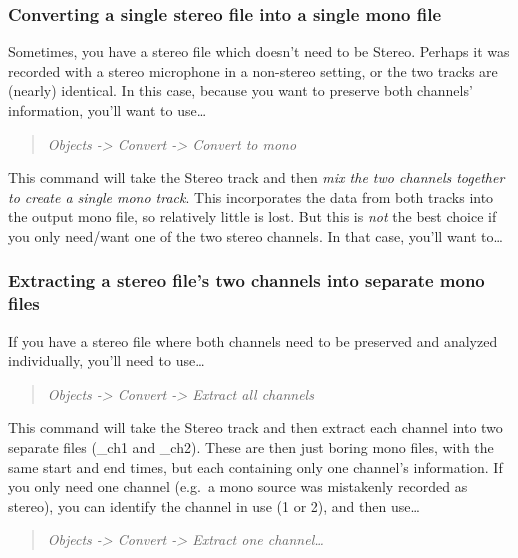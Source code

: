 \hypertarget{converting-a-single-stereo-file-into-a-single-mono-file}{%
\subsubsection{Converting a single stereo file into a single mono
file}\label{converting-a-single-stereo-file-into-a-single-mono-file}}

Sometimes, you have a stereo file which doesn't need to be Stereo.
Perhaps it was recorded with a stereo microphone in a non-stereo
setting, or the two tracks are (nearly) identical. In this case, because
you want to preserve both channels' information, you'll want to
use\ldots{}

\begin{quote}
\emph{Objects -\textgreater{} Convert -\textgreater{} Convert to mono}
\end{quote}

This command will take the Stereo track and then \emph{mix the two
channels together to create a single mono track}. This incorporates the
data from both tracks into the output mono file, so relatively little is
lost. But this is \emph{not} the best choice if you only need/want one
of the two stereo channels. In that case, you'll want to\ldots{}

\hypertarget{extracting-a-stereo-files-two-channels-into-separate-mono-files}{%
\subsubsection{Extracting a stereo file's two channels into separate
mono
files}\label{extracting-a-stereo-files-two-channels-into-separate-mono-files}}

If you have a stereo file where both channels need to be preserved and
analyzed individually, you'll need to use\ldots{}

\begin{quote}
\emph{Objects -\textgreater{} Convert -\textgreater{} Extract all
channels}
\end{quote}

This command will take the Stereo track and then extract each channel
into two separate files (\_ch1 and \_ch2). These are then just boring
mono files, with the same start and end times, but each containing only
one channel's information. If you only need one channel (e.g.~a mono
source was mistakenly recorded as stereo), you can identify the channel
in use (1 or 2), and then use\ldots{}

\begin{quote}
\emph{Objects -\textgreater{} Convert -\textgreater{} Extract one
channel\ldots{}}
\end{quote}

